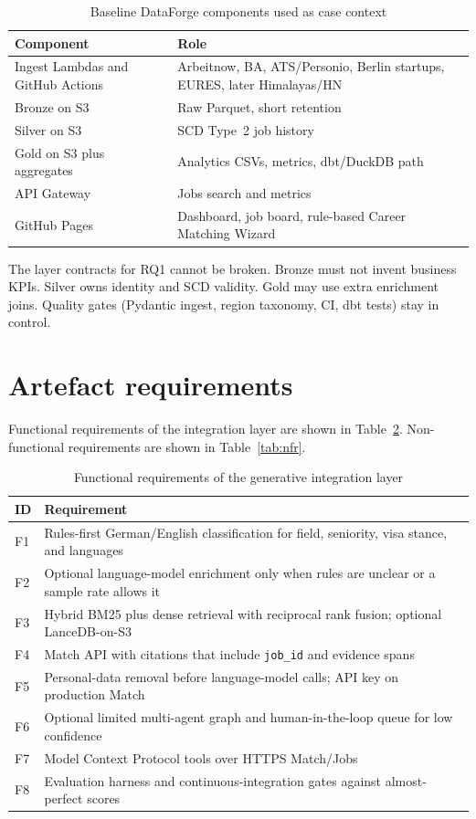 \begin{table}[ht]
\centering
\caption{Baseline DataForge components used as case context}
\label{tab:baseline}
\begin{tabularx}{\textwidth}{@{}lX@{}}
\toprule
\textbf{Component} & \textbf{Role} \\
\midrule
Ingest Lambdas and GitHub Actions & Arbeitnow, BA, ATS/Personio, Berlin startups, EURES, later Himalayas/HN \\
Bronze on S3 & Raw Parquet, short retention \\
Silver on S3 & SCD Type~2 job history \\
Gold on S3 plus aggregates & Analytics CSVs, metrics, dbt/DuckDB path \\
API Gateway & Jobs search and metrics \\
GitHub Pages & Dashboard, job board, rule-based Career Matching Wizard \\
\bottomrule
\end{tabularx}
\end{table}

The layer contracts for RQ1 cannot be broken. Bronze must not invent business KPIs. Silver owns identity and SCD validity. Gold may use extra enrichment joins. Quality gates (Pydantic ingest, region taxonomy, CI, dbt tests) stay in control.

\section{Artefact requirements}
\label{sec:requirements}

Functional requirements of the integration layer are shown in Table~\ref{tab:func-req}. Non-functional requirements are shown in Table~\ref{tab:nfr}.

\begin{table}[ht]
\centering
\caption{Functional requirements of the generative integration layer}
\label{tab:func-req}
\begin{tabularx}{\textwidth}{@{}lX@{}}
\toprule
\textbf{ID} & \textbf{Requirement} \\
\midrule
F1 & Rules-first German/English classification for field, seniority, visa stance, and languages \\
F2 & Optional language-model enrichment only when rules are unclear or a sample rate allows it \\
F3 & Hybrid BM25 plus dense retrieval with reciprocal rank fusion; optional LanceDB-on-S3 \\
F4 & Match API with citations that include \texttt{job\_id} and evidence spans \\
F5 & Personal-data removal before language-model calls; API key on production Match \\
F6 & Optional limited multi-agent graph and human-in-the-loop queue for low confidence \\
F7 & Model Context Protocol tools over HTTPS Match/Jobs \\
F8 & Evaluation harness and continuous-integration gates against almost-perfect scores \\
\bottomrule
\end{tabularx}
\end{table}

